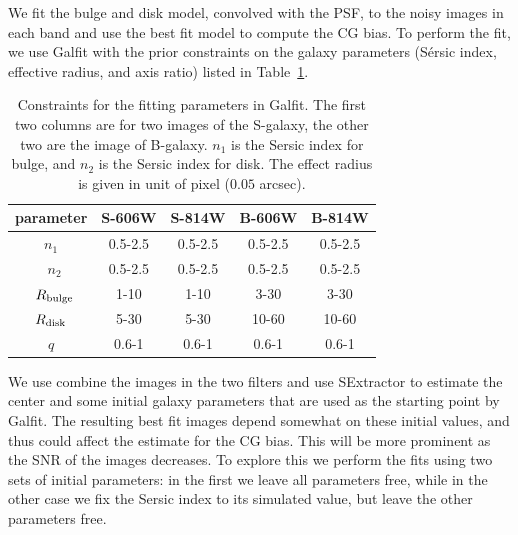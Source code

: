 \documentclass[useAMS,usenatbib]{mnras}
\begin{document}
We fit the bulge and disk model, convolved with the PSF, to  the noisy images in each band and use the best fit model to compute the CG bias. To perform the fit, we use {\sc Galfit} \citep{Peng10} with 
the prior constraints on the galaxy parameters (S{\'e}rsic index, effective radius, and axis ratio) listed in Table~\ref{fitpar}.
\begin{table}
\begin{center}
\begin{tabular}{ccc|cc}
\hline\hline
parameter &S-606W  & S-814W  & B-606W & B-814W \\ \hline
$n_1$ &0.5-2.5  &0.5-2.5  &0.5-2.5 &0.5-2.5 \\ \
$n_2$ &0.5-2.5  &0.5-2.5  &0.5-2.5 &0.5-2.5 \\ \
$R_{\rm bulge}$ &1-10 &1-10  &3-30  &3-30  \\ 
$R_{\rm disk}$  &5-30 &5-30  &10-60 &10-60 \\ 
$q$      &0.6-1  &0.6-1  &0.6-1 &0.6-1 \\ 
\hline
\end{tabular}
\caption{\label{fitpar} Constraints for the fitting parameters in {\sc Galfit}.
The first two columns are for two images of the S-galaxy, the other two are
the image of B-galaxy.
$n_1$ is the Sersic index for bulge, and $n_2$ is the Sersic index for disk.
The effect radius is given in unit of pixel ($0.05$ arcsec).}
\end{center}
\end{table}

We use combine the images in the two filters and use {\sc SExtractor}
to estimate the center and some initial galaxy parameters that are used
as the starting point by {\sc Galfit}. The resulting best fit images
depend somewhat on these initial values, and thus could affect the 
estimate for the CG bias. This will be more prominent as the SNR of
the images decreases. To explore this we perform the fits using two
sets of initial parameters: in the first we leave all parameters free,
while in the other case we fix the Sersic index to its simulated value,
but leave the other parameters free.
\end{document}
